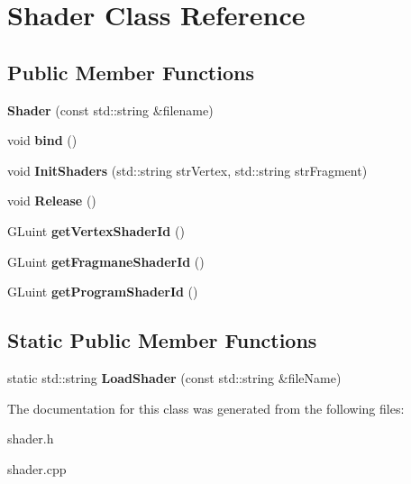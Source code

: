 \hypertarget{classShader}{
\section{Shader Class Reference}
\label{classShader}
}
\subsection*{Public Member Functions}
\begin{DoxyCompactItemize}
\item 
\hypertarget{classShader_aab6796612c50cc11ad6ebf31c4c4386d}{
{\bfseries Shader} (const std::string \&filename)}
\label{classShader_aab6796612c50cc11ad6ebf31c4c4386d}

\item 
\hypertarget{classShader_a6f6e280a343d6c7662909f7dfbc89ad9}{
void {\bfseries bind} ()}
\label{classShader_a6f6e280a343d6c7662909f7dfbc89ad9}

\item 
\hypertarget{classShader_a51373dbc46459f823c38f987b13f3975}{
void {\bfseries InitShaders} (std::string strVertex, std::string strFragment)}
\label{classShader_a51373dbc46459f823c38f987b13f3975}

\item 
\hypertarget{classShader_ab54c6fe63a0961380132be979f00a791}{
void {\bfseries Release} ()}
\label{classShader_ab54c6fe63a0961380132be979f00a791}

\item 
\hypertarget{classShader_a97bac997e4e8ff3ea8f072e09110fbff}{
GLuint {\bfseries getVertexShaderId} ()}
\label{classShader_a97bac997e4e8ff3ea8f072e09110fbff}

\item 
\hypertarget{classShader_a8eadc6215cec4c15d283783231f60318}{
GLuint {\bfseries getFragmaneShaderId} ()}
\label{classShader_a8eadc6215cec4c15d283783231f60318}

\item 
\hypertarget{classShader_a4112f1b765a232e472d2c3f82d036371}{
GLuint {\bfseries getProgramShaderId} ()}
\label{classShader_a4112f1b765a232e472d2c3f82d036371}

\end{DoxyCompactItemize}
\subsection*{Static Public Member Functions}
\begin{DoxyCompactItemize}
\item 
\hypertarget{classShader_a9645692b6d18b34c8094c329a9a4d343}{
static std::string {\bfseries LoadShader} (const std::string \&fileName)}
\label{classShader_a9645692b6d18b34c8094c329a9a4d343}

\end{DoxyCompactItemize}


The documentation for this class was generated from the following files:\begin{DoxyCompactItemize}
\item 
shader.h\item 
shader.cpp\end{DoxyCompactItemize}
